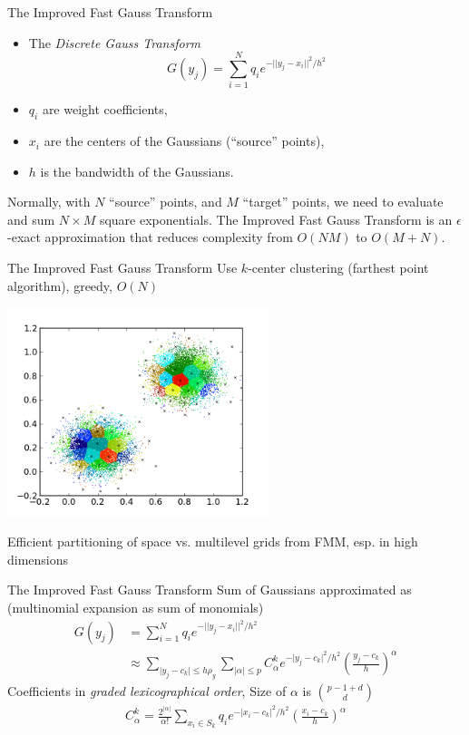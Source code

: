 \documentclass[xcolor=pdftex,dvipsnames,table]{beamer}
\newcommand{\eq}[1]{\begin{align*} #1 \end{align*}}
\newcommand{\abs}[1]{\lvert #1 \rvert}
\begin{document}
\begin{frame}{The Improved Fast Gauss Transform}
\begin{itemize}
\item The \emph{Discrete Gauss Transform} 
\begin{equation}
  G(y_j) = \sum_{i=1}^{N} q_i e^{-\abs{\abs{y_j-x_i}}^2/h^2}
\end{equation}
\item $q_i$ are weight coefficients, 
\item $x_i$ are the centers of the Gaussians (``source'' points), 
\item $h$ is the bandwidth of the Gaussians.
\end{itemize}
Normally, with $N$ ``source'' points, and $M$ ``target'' points, we need to evaluate and sum $N\times M$ square exponentials. The Improved Fast Gauss Transform is an $\epsilon$-exact approximation that reduces complexity from $O(NM)$ to $O(M+N)$.  
\end{frame}

\begin{frame}{The Improved Fast Gauss Transform}
  Use $k$-center clustering (farthest point algorithm), greedy, $O(N)$
  \begin{center}\includegraphics[width=3in]{clusters.png}\end{center}
  Efficient partitioning of space vs. multilevel grids from FMM, esp. in high dimensions
\end{frame}

\begin{frame}{The Improved Fast Gauss Transform}
  Sum of Gaussians approximated as (multinomial expansion as sum of monomials)
  \eq{G(y_j) &= \sum_{i=1}^{N} q_i e^{-\abs{\abs{y_j-x_i}}^2/h^2} \\
  &\approx \sum_{\abs{y_j-c_k}\leq h\rho_y} \sum_{\abs{\alpha}\leq p} C_\alpha^k e^{-\abs{y_j-c_k}^2/h^2}\left(\frac{y_j-c_k}{h}\right)^\alpha}
  Coefficients in \emph{graded lexicographical order}, Size of $\alpha$ is $\binom{p-1+d}{d}$
  \eq{C_\alpha^k=\frac{2^{\abs{\alpha}}}{\alpha!}\sum_{x_i\in S_k}q_ie^{-\abs{x_i-c_k}^2/h^2}\left(\frac{x_i-c_k}{h}\right)^\alpha}
\end{frame}
\end{document}
